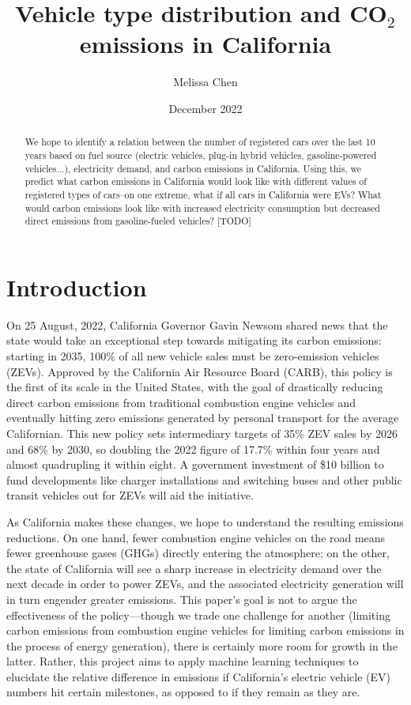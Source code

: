 \documentclass{article}
\begin{document}
\title{Vehicle type distribution and CO\(_2\) emissions in California}
\author{Melissa Chen}
\date{December 2022}

\maketitle

\begin{abstract}
We hope to identify a relation between the number of registered cars over the last 10 years based on fuel source (electric vehicles, plug-in hybrid vehicles, gasoline-powered vehicles...), electricity demand, and carbon emissions in California. Using this, we predict what carbon emissions in California would look like with different values of registered types of cars--on one extreme, what if all cars in California were EVs? What would carbon emissions look like with increased electricity consumption but decreased direct emissions from gasoline-fueled vehicles? [TODO]
\end{abstract}

\section{Introduction}
On 25 August, 2022, California Governor Gavin Newsom shared news that the state would take an exceptional step towards mitigating its carbon emissions: starting in 2035, 100\% of all new vehicle sales must be zero-emission vehicles (ZEVs). Approved by the California Air Resource Board (CARB), this policy is the first of its scale in the United States, with the goal of drastically reducing direct carbon emissions from traditional combustion engine vehicles and eventually hitting zero emissions generated by personal transport for the average Californian. This new policy sets intermediary targets of 35\% ZEV sales by 2026 and 68\% by 2030, so doubling the 2022 figure of 17.7\% within four years and almost quadrupling it within eight. A government investment of \$10 billion to fund developments like charger installations and switching buses and other public transit vehicles out for ZEVs will aid the initiative. \citep{zevpolicy, currentzevsales}

As California makes these changes, we hope to understand the resulting emissions reductions. On one hand, fewer combustion engine vehicles on the road means fewer greenhouse gases (GHGs) directly entering the atmosphere; on the other, the state of California will see a sharp increase in electricity demand over the next decade in order to power ZEVs, and the associated electricity generation will in turn engender greater emissions. This paper's goal is not to argue the effectiveness of the policy---though we trade one challenge for another (limiting carbon emissions from combustion engine vehicles for limiting carbon emissions in the process of energy generation), there is certainly more room for growth in the latter. Rather, this project aims to apply machine learning techniques to elucidate the relative difference in emissions if California's electric vehicle (EV) numbers hit certain milestones, as opposed to if they remain as they are.
\end{document}
